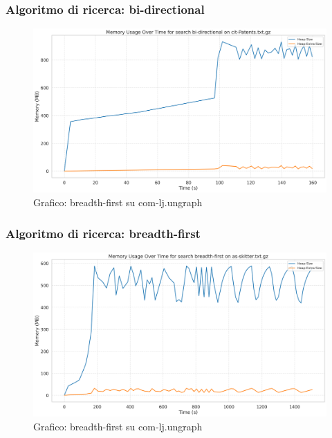 \documentclass{article}
\begin{document}
\subsubsection{Algoritmo di ricerca: bi-directional}
\begin{figure}[h]\centering
	\includegraphics[width=\textwidth]{../plots/cit-Patents_bi-directional.png}
	\caption{Grafico: breadth-first su com-lj.ungraph}
\end{figure}
\subsubsection{Algoritmo di ricerca: breadth-first}
\begin{figure}[h]\centering
	\includegraphics[width=\textwidth]{../plots/as-skitter_breadth-first.png}
	\caption{Grafico: breadth-first su com-lj.ungraph}
\end{figure}
\end{document}
